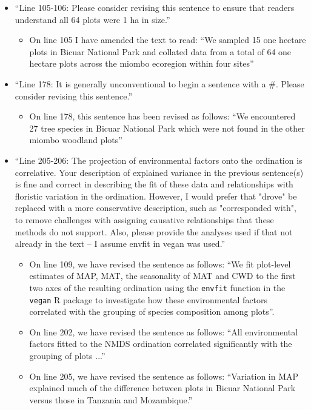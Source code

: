 \documentclass[a4paper]{letter}
\begin{document}
\begin{letter}{}
\begin{itemize}
\begin{itemize}
		\end{itemize}
	\item{``Line 105-106: Please consider revising this sentence to ensure that readers understand all 64 plots were 1 ha in size.''}
		\begin{itemize}
			\item{On line 105 I have amended the text to read: ``We sampled 15 one hectare plots in Bicuar National Park and collated data from a total of 64 one hectare plots across the miombo ecoregion within four sites''}
		\end{itemize}
	\item{``Line 178: It is generally unconventional to begin a sentence with a \#. Please consider revising this sentence.''}
		\begin{itemize}
			\item{On line 178, this sentence has been revised as follows: ``We encountered 27 tree species in Bicuar National Park which were not found in the other miombo woodland plots''}
		\end{itemize}
	\item{``Line 205-206: The projection of environmental factors onto the ordination is correlative. Your description of explained variance in the previous sentence(s) is fine and correct in describing the fit of these data and relationships with floristic variation in the ordination. However, I would prefer that "drove" be replaced with a more conservative description, such as "corresponded with", to remove challenges with assigning causative relationships that these methods do not support. Also, please provide the analyses used if that not already in the text – I assume envfit in vegan was used.''}
		\begin{itemize}
			\item{On line 109, we have revised the sentence as follows: ``We fit plot-level estimates of MAP, MAT, the seasonality of MAT and CWD to the first two axes of the resulting ordination using the \texttt{envfit} function in the \texttt{vegan} R package to investigate how these environmental factors correlated with the grouping of species composition among plots''.}
			\item{On line 202, we have revised the sentence as follows: ``All environmental factors fitted to the NMDS ordination correlated significantly with the grouping of plots ...''}
			\item{On line 205, we have revised the sentence as follows: ``Variation in MAP explained much of the difference between plots in Bicuar National Park versus those in Tanzania and Mozambique.''}

\end{itemize}
\end{itemize}
\end{letter}
\end{document}
